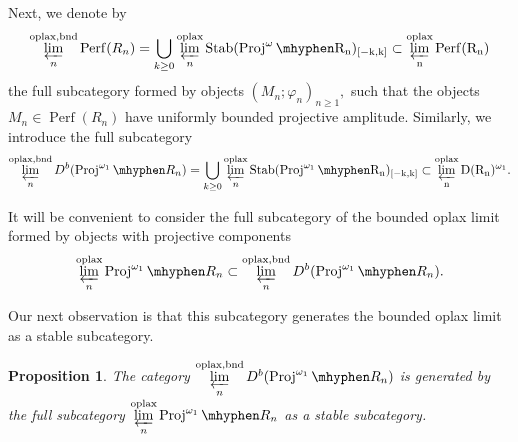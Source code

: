 \documentclass[11pt,leqno]{amsart}
\newtheorem{prop}[theo]{Proposition}
\newtheorem{remark}[theo]{Remark}
\numberwithin{equation}{section}
\newcommand{\hy}{\mhyphen}
\newcommand{\prolim}[1][]{\mathop{\varprojlim}\limits_{#1}}
\newcommand{\bnd}{\operatorname{bnd}}
\newcommand{\oplax}{\operatorname{oplax}}
\newcommand{\Proj}{\operatorname{Proj}}
\newcommand{\Flat}{\operatorname{Flat}}
\newcommand{\Perf}{\operatorname{Perf}}
\newcommand{\Stab}{\rm Stab}
\begin{document}
Next, we denote by 
\begin{equation*}
\prolim[n]^{\oplax,\bnd}\Perf(R_n)=\bigcup\limits_{k\geq 0}\prolim[n]^{\oplax}\Stab(\Proj^{\omega}\hy R_n)_{[-k,k]}\subset \prolim[n]^{\oplax}\Perf(R_n)
\end{equation*} 
the full subcategory formed by objects $(M_n;\varphi_n)_{n\geq 1},$ such that the objects $M_n\in\Perf(R_n)$ have uniformly bounded projective amplitude. Similarly, we introduce the full subcategory
\begin{equation*}
	\prolim[n]^{\oplax,\bnd}D^b(\Proj^{\omega_1}\hy R_n)=\bigcup\limits_{k\geq 0}\prolim[n]^{\oplax}\Stab(\Proj^{\omega_1}\hy R_n)_{[-k,k]}\subset \prolim[n]^{\oplax}D(R_n)^{\omega_1}.
\end{equation*} 

It will be convenient to consider the full subcategory of the bounded oplax limit formed by objects with projective components
\begin{equation*}
\prolim[n]^{\oplax}\Proj^{\omega_1}\hy R_n\subset 	\prolim[n]^{\oplax,\bnd}D^b(\Proj^{\omega_1}\hy R_n).
\end{equation*}

Our next observation is that this subcategory generates the bounded oplax limit as a stable subcategory.

\begin{prop}\label{prop:oplax_limit_of_proj_generates}
The category $\prolim[n]^{\oplax,\bnd}D^b(\Proj^{\omega_1}\hy R_n)$ is generated by the full subcategory $\prolim[n]^{\oplax}\Proj^{\omega_1}\hy R_n$ as a stable subcategory.
\end{prop}

\end{document}
